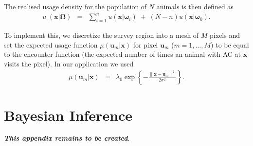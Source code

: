 \documentclass[10pt,a4paper]{article}
\begin{document}
The realised usage density for the population of $N$ animals is then defined as
\begin{eqnarray*}
u_\cdot(\bm{x}|\bm{\Omega})&=&\sum_{i=1}^nu(\bm{x}|\bm{\omega}_i)\;+\;(N-n)u(\bm{x}|\bm{\omega}_0).
\end{eqnarray*}

To implement this, we discretize the survey region into a mesh of $M$ pixels and set the expected usage function $\mu(\bm{u}_m|\bm{x})$ for pixel $\bm{u}_m$ ($m=1,\ldots,M$) to be equal to the encounter function (the expected number of times an animal with AC at $\bm{x}$ visits the pixel). In our application we used
\begin{eqnarray*}
\mu(\bm{u}_m|\bm{x})&=&\lambda_0\exp\left\{-\frac{\lVert \bm{x}-\bm{u}_m\rVert^2}{2\sigma^2}\right\}.
\end{eqnarray*}


\section{Bayesian Inference}
\label{appx:Bayesinference}

\textbf{\textit{This appendix remains to be created}}.
\end{document}
